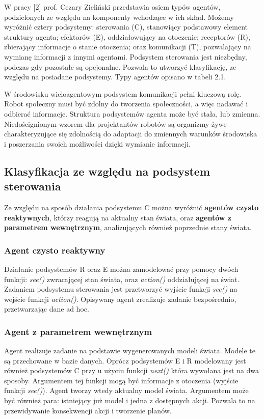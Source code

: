 W pracy [2] prof. Cezary Zieliński przedstawia osiem typów agentów, podzielonych ze względu na komponenty wchodzące w ich skład. Możemy wyróżnić cztery podsystemy: sterowania (C), stanowiący podstawowy element struktury agenta; efektorów (E), oddziałowujący na otoczenie; receptorów (R), zbierający informacje o stanie otoczenia; oraz komunikacji (T), pozwalający na wymianę informacji z innymi agentami. Podsystem sterowania jest niezbędny, podczas gdy pozostałe są opcjonalne. Pozwala to utworzyć klasyfikację, ze względu na posiadane podsystemy. Typy agentów opisano w tabeli 2.1. %

W środowisku wieloagentowym podsystem komunikacji pełni kluczową rolę. Robot społeczny musi być zdolny do tworzenia społeczności, a więc nadawać i odbierać informacje. Struktura podsystemów agenta może być stała, lub zmienna. Niedoścignionym wzorem dla projektantów robotów są organizmy żywe charakteryzujące się zdolnością do adaptacji do zmiennych warunków środowiska i poszerzania swoich możliwości dzięki wymianie informacji. 

\subsection{Klasyfikacja ze względu na podsystem sterowania}

Ze względu na sposób działania podsystemu C można wyróżnić \textbf{agentów czysto reaktywnych}, którzy reagują na aktualny stan świata, oraz \textbf{agentów z parametrem wewnętrznym}, analizujących również poprzednie stany świata. 

\subsubsection{Agent czysto reaktywny}

Działanie podsystemów R oraz E można zamodelować przy pomocy dwóch funkcji: \textit{see()} zwracającej stan świata, oraz \textit{action()} oddziałującej na świat. Zadaniem podsystemu sterowania jest przetworzyć wyjście funkcji \textit{see()} na wejście funkcji \textit{action()}. Opisywany agent zrealizuje zadanie bezpośrednio, przetwarzając dane ad hoc.

\subsubsection{Agent z parametrem wewnętrznym}

Agent realizuje zadanie na podstawie wygenerowanych modeli świata. Modele te są przechowane w bazie danych. Oprócz podsystemów E i R modelowany jest również podsystemów C przy u użyciu funkcji \textit{next()} która wywołana jest na dwa sposoby. Argumentem tej funkcji mogą być informacje z otoczenia (wyjście funkcji \textit{see()}). Agent tworzy wtedy aktualny model świata. Argumentem może być również para: istniejący już model i jedna z dostępnych akcji. Pozwala to na przewidywanie konsekwencji akcji i tworzenie planów. 

